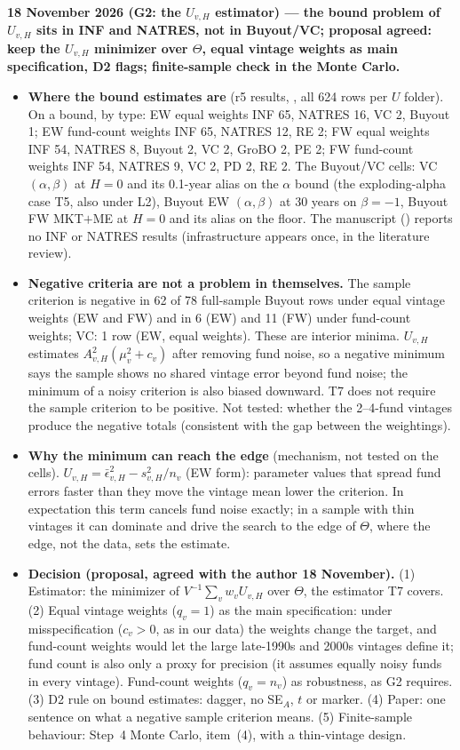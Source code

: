 \documentclass[11pt]{article}
\newcommand{\file}[1]{\path{#1}}
\begin{document}
\textbf{18 November 2026 (G2: the $U_{v,H}$ estimator) --- the bound problem of $U_{v,H}$ sits in INF and NATRES, not in Buyout/VC; proposal agreed: keep the $U_{v,H}$ minimizer over $\Theta$, equal vintage weights as main specification, D2 flags; finite-sample check in the Monte Carlo.}
\begin{itemize}
\item \textbf{Where the bound estimates are} (r5 results, \file{results/data_out_2026-emp-c/}, all 624 rows per $U$ folder). On a bound, by type: EW equal weights INF 65, NATRES 16, VC 2, Buyout 1; EW fund-count weights INF 65, NATRES 12, RE 2; FW equal weights INF 54, NATRES 8, Buyout 2, VC 2, GroBO 2, PE 2; FW fund-count weights INF 54, NATRES 9, VC 2, PD 2, RE 2. The Buyout/VC cells: VC $(\alpha,\beta)$ at $H=0$ and its 0.1-year alias on the $\alpha$ bound (the exploding-alpha case T5, also under L2), Buyout EW $(\alpha,\beta)$ at 30 years on $\beta=-1$, Buyout FW MKT$+$ME at $H=0$ and its alias on the floor. The manuscript (\file{tex/sdf_paper.tex}) reports no INF or NATRES results (infrastructure appears once, in the literature review).
\item \textbf{Negative criteria are not a problem in themselves.} The sample criterion is negative in 62 of 78 full-sample Buyout rows under equal vintage weights (EW and FW) and in 6 (EW) and 11 (FW) under fund-count weights; VC: 1 row (EW, equal weights). These are interior minima. $U_{v,H}$ estimates $A_{v,H}^2(\mu_v^2+c_v)$ after removing fund noise, so a negative minimum says the sample shows no shared vintage error beyond fund noise; the minimum of a noisy criterion is also biased downward. T7 does not require the sample criterion to be positive. Not tested: whether the 2--4-fund vintages produce the negative totals (consistent with the gap between the weightings).
\item \textbf{Why the minimum can reach the edge} (mechanism, not tested on the cells). $U_{v,H}=\bar\epsilon_{v,H}^2-s_{v,H}^2/n_v$ (EW form): parameter values that spread fund errors faster than they move the vintage mean lower the criterion. In expectation this term cancels fund noise exactly; in a sample with thin vintages it can dominate and drive the search to the edge of $\Theta$, where the edge, not the data, sets the estimate.
\item \textbf{Decision (proposal, agreed with the author 18 November).} (1) Estimator: the minimizer of $V^{-1}\sum_v w_vU_{v,H}$ over $\Theta$, the estimator T7 covers. (2) Equal vintage weights ($q_v=1$) as the main specification: under misspecification ($c_v>0$, as in our data) the weights change the target, and fund-count weights would let the large late-1990s and 2000s vintages define it; fund count is also only a proxy for precision (it assumes equally noisy funds in every vintage). Fund-count weights ($q_v=n_v$) as robustness, as G2 requires. (3) D2 rule on bound estimates: dagger, no SE$_A$, $t$ or marker. (4) Paper: one sentence on what a negative sample criterion means. (5) Finite-sample behaviour: Step~4 Monte Carlo, item~(4), with a thin-vintage design.

\end{itemize}
\end{document}
